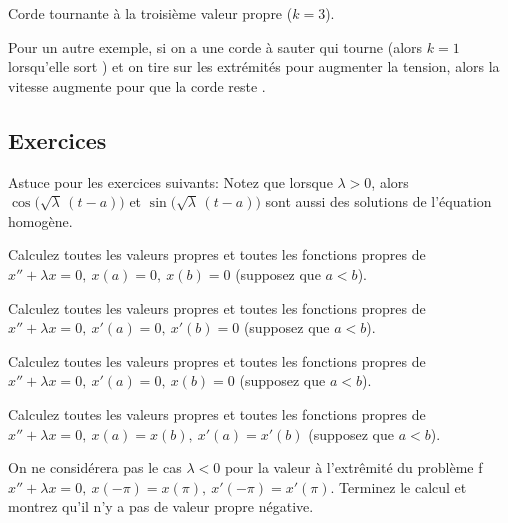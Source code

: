 \begin{myfig}
\capstart
{}
\caption{Corde tournante à la troisième valeur propre ($k=3$).\label{bvp:whirstring2fig}}
\end{myfig}

Pour un autre exemple, si on a une corde à sauter qui tourne (alors $k=1$ lorsqu'elle sort ) et on tire sur les extrémités pour augmenter la tension, alors la vitesse augmente pour que la corde reste .
 

\subsection{Exercices}

Astuce pour les exercices suivants:  Notez que lorsque  $\lambda > 0$, alors
$\cos \bigl( \sqrt{\lambda}\, (t - a) \bigr)$
et $\sin  \bigl( \sqrt{\lambda}\, (t - a) \bigr)$
sont aussi des solutions de l'équation homogène. 

\begin{exercise}
Calculez toutes les valeurs propres et toutes les fonctions propres de 
$x'' + \lambda x = 0, ~ x(a) = 0, ~ x(b) = 0$ (supposez que $a < b$).
\end{exercise}

\begin{exercise}
Calculez toutes les valeurs propres et toutes les fonctions propres de 
$x'' + \lambda x = 0, ~ x'(a) = 0, ~ x'(b) = 0$ (supposez que $a < b$).
\end{exercise}

\begin{exercise}
Calculez toutes les valeurs propres et toutes les fonctions propres de 
$x'' + \lambda x = 0, ~ x'(a) = 0, ~ x(b) = 0$ (supposez que $a < b$).
\end{exercise}

\begin{exercise}
Calculez toutes les valeurs propres et toutes les fonctions propres de 
$x'' + \lambda x = 0, ~ x(a) = x(b), ~ x'(a) = x'(b)$ (supposez que $a < b$).
\end{exercise}

\begin{exercise}
On ne considérera pas le cas  $\lambda < 0$ pour la valeur à l'extrêmité du problème f
$x'' + \lambda x = 0, ~ x(-\pi) = x(\pi), ~ x'(-\pi) = x'(\pi)$.
Terminez le calcul et montrez qu'il n'y a pas de valeur propre négative. 
\end{exercise}

